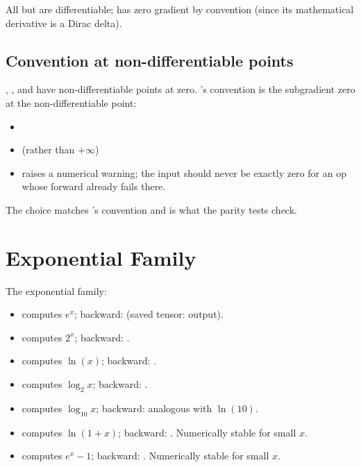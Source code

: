 All but  are differentiable;  has zero
gradient by convention (since its mathematical derivative is a
Dirac delta).

\subsection{Convention at non-differentiable points}
\label{ssec:unary_functions:nondiff_conv}

, , and  have non-differentiable
points at zero. \Lucid's convention is the subgradient zero at the
non-differentiable point:

\begin{itemize}
  \item {}
  \item {} (rather than \(+\infty\))
  \item {} raises a numerical warning; the input
    should never be exactly zero for an op whose forward already
    fails there.
\end{itemize}

The choice matches 's convention and is what the
parity tests check.

\section{Exponential Family}
\label{sec:unary_functions:exp}

The exponential family:

\begin{itemize}
  \item {} computes $e^x$; backward:
     (saved tensor: output).
  \item {} computes $2^x$; backward:
    .
  \item {} computes $\ln(x)$; backward:
    .
  \item {} computes $\log_2 x$; backward:
    .
  \item {} computes $\log_{10} x$; backward:
    analogous with $\ln(10)$.
  \item {} computes $\ln(1 + x)$; backward:
    . Numerically stable
    for small $x$.
  \item {} computes $e^x - 1$; backward:
    . Numerically
    stable for small $x$.
\end{itemize}

